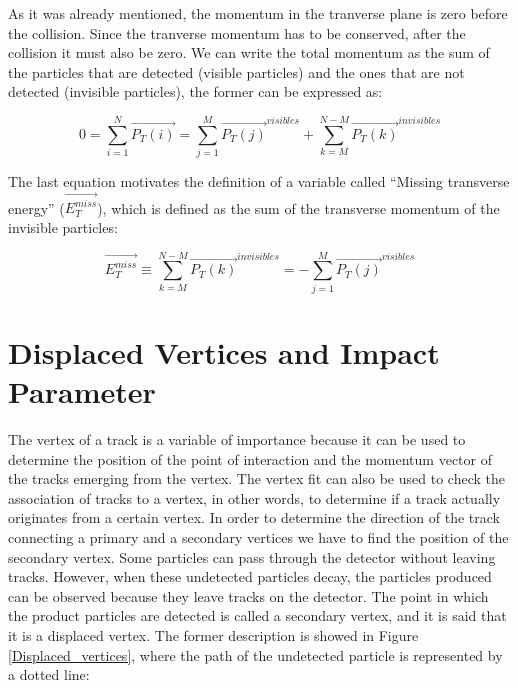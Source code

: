  As it was already mentioned, the momentum in the tranverse plane is zero before the collision. Since the tranverse momentum has to be conserved, after the collision it must also be zero. We can write
 the total momentum as the sum of the particles that are detected (visible particles) and the ones that are not detected (invisible particles), the former can be expressed as:
 
 \begin{equation}
  0 = \sum_{i=1}^N \vec{P_T(i)} = \sum_{j=1}^M \vec{P_T(j)}^{visibles} + \sum_{k=M}^{N-M} \vec{P_T(k)}^{invisibles}
 \end{equation}


 The last equation motivates the definition of a variable called ``Missing transverse energy'' ($\vec{E_T^{miss}}$), which is defined as the sum of the transverse momentum of the invisible
 particles:
 
 \begin{equation}
  \vec{E_T^{miss}} \equiv \sum_{k=M}^{N-M}\vec{P_T(k)}^{invisibles} = - \sum_{j=1}^M  \vec{P_T(j)}^{visibles}
 \end{equation}

 
 \section{Displaced Vertices and Impact Parameter}
The vertex of a track is a variable of importance because it can be used to determine the position of the point of interaction and the momentum vector of the tracks emerging from the vertex. The 
vertex fit can also be used to check the association of tracks to a vertex, in other words, to determine if a track actually originates from a certain vertex. In order to determine the direction of the track connecting a primary and a secondary vertices we have to find the position of the secondary vertex. Some particles can pass through the detector without leaving tracks. However, when these undetected particles decay, the particles produced can be observed because they leave tracks on the detector. The point in which the product particles are detected is called a secondary vertex, and it is said that it is a displaced vertex. The former description is showed in Figure \ref{Displaced_vertices}, where the path of the undetected particle is represented by a dotted line:

 
